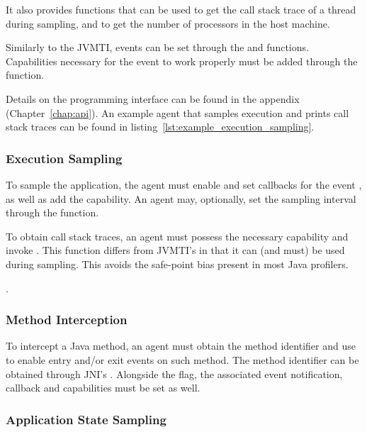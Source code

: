 It also provides functions that can be used to get the call stack trace of a thread during sampling, and to get the number of processors in the host machine.

Similarly to the JVMTI, events can be set through the  and  functions. Capabilities necessary for the event to work properly must be added through the  function.

Details on the programming interface can be found in the appendix (Chapter~\ref{chap:api}). An example agent that samples execution and prints call stack traces can be found in listing~\ref{lst:example_execution_sampling}.

\subsubsection{Execution Sampling}

To sample the application, the agent must enable and set callbacks for the event , as well as add the  capability. An agent may, optionally, set the sampling interval through the  function.


To obtain call stack traces, an agent must possess the necessary capability and invoke . This function differs from JVMTI's  in that it can (and must) be used during sampling. This avoids the safe-point bias present in most Java profilers.


.

\subsubsection{Method Interception}

To intercept a Java method, an agent must obtain the method identifier and use  to enable entry and/or exit events on such method. The method identifier can be obtained through JNI's . Alongside the flag, the associated event notification, callback and capabilities must be set as well.

\subsubsection{Application State Sampling}

